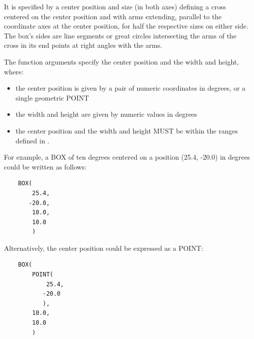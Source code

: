 \documentclass[11pt,a4paper]{ivoa}
\begin{document}
It is specified by a center position and size
(in both axes) defining a cross centered on the center position and
with arms extending, parallel to the coordinate axes at the center position,
for half the respective sizes on either side. The box’s sides are line
segments or great circles intersecting the arms of the cross in its end
points at right angles with the arms.



The function arguments specify the center position and the width and height,
where:
\begin{itemize}
    \item the center position is given by a pair of numeric coordinates
    in degrees, or a single geometric POINT
    \item the width and height are given by numeric values in degrees
    \item the center position and the width and height MUST be within the ranges defined in
    .
\end{itemize}

For example, a BOX of ten degrees centered on a position
(25.4, -20.0) in degrees could be written as follows:
\begin{verbatim}
    BOX(
        25.4,
       -20.0,
        10.0,
        10.0
        )
\end{verbatim}

Alternatively, the center position could be expressed as a POINT:
\begin{verbatim}
    BOX(
        POINT(
            25.4,
           -20.0
           ),
        10.0,
        10.0
        )
\end{verbatim}
\end{document}
